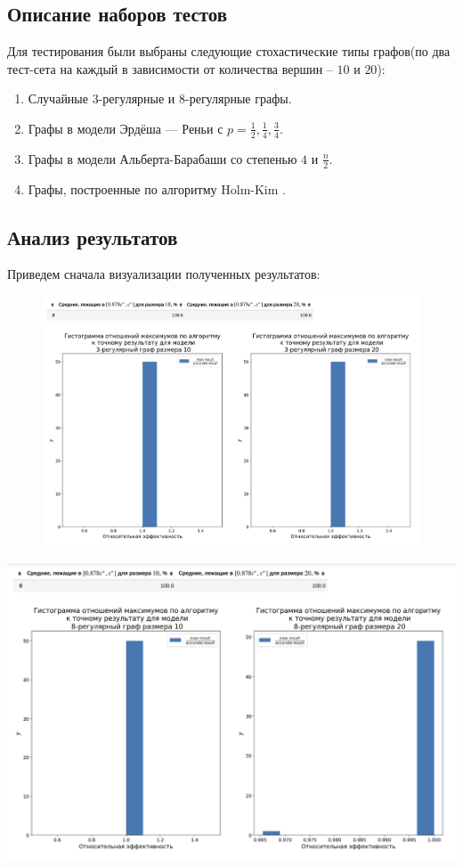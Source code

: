 \documentclass[12pt, a4paper]{article}
\begin{document}
\subsection{Описание наборов тестов}

Для тестирования были выбраны следующие стохастические типы графов(по два тест-сета на каждый в зависимости от количества вершин -- $10$ и $20$):

\begin{enumerate}
    \item Случайные 3-регулярные и 8-регулярные графы.
    \item Графы в модели Эрдёша — Реньи с $p=\frac{1}{2}, \frac{1}{4}, \frac{3}{4}$.
    \item Графы в модели Альберта-Барабаши со степенью $4$ и $\frac{n}{2}$.
    \item Графы, построенные по алгоритму Holm-Kim \cite{Holm}.
\end{enumerate}

\subsection{Анализ результатов}
Приведем сначала визуализации полученных результатов:

\begin{figure}[h]
\centering
\includegraphics[width=1\textwidth]{images/1.png}
\caption[width=1\textwidth]{}
\label{fig:fig4}
\end{figure}

\includegraphics[width=1\textwidth]{images/2.png}
\end{document}
